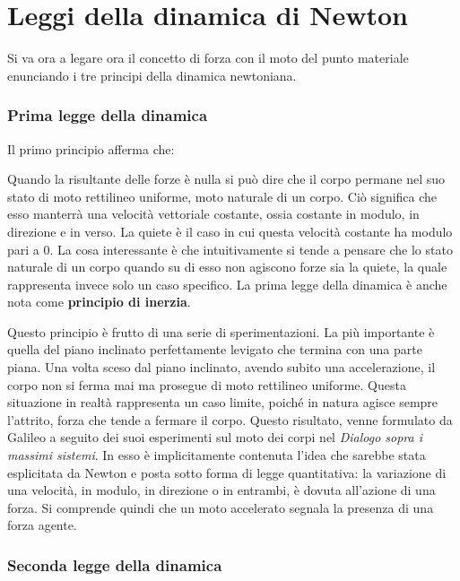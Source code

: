\documentclass[10pt,a4paper]{book}
\begin{document}
\section{Leggi della dinamica di Newton}

Si va ora a legare ora il concetto di forza con il moto del punto materiale enunciando i tre principi della dinamica newtoniana.

\subsubsection{Prima legge della dinamica}

Il primo principio afferma che:

\noindent{}

Quando la risultante delle forze è nulla si può dire che il corpo permane nel suo stato di moto rettilineo uniforme, moto naturale di un corpo. Ciò significa che esso manterrà una velocità vettoriale costante, ossia costante in modulo, in direzione e in verso. La quiete è il caso in cui questa velocità costante ha modulo pari a $0$. La cosa interessante è che intuitivamente si tende a pensare che lo stato naturale di un corpo quando su di esso non agiscono forze sia la quiete, la quale rappresenta invece solo un caso specifico. La prima legge della dinamica è anche nota come \textbf{principio di inerzia}.

Questo principio è frutto di una serie di sperimentazioni. La più importante è quella del piano inclinato perfettamente levigato che termina con una parte piana. Una volta sceso dal piano inclinato, avendo subito una accelerazione, il corpo non si ferma mai ma prosegue di moto rettilineo uniforme. Questa situazione in realtà rappresenta un caso limite, poiché in natura agisce sempre l'attrito, forza che tende a fermare il corpo. Questo risultato, venne formulato da Galileo a seguito dei suoi esperimenti sul moto dei corpi nel \textit{Dialogo sopra i massimi sistemi}. In esso è implicitamente contenuta l'idea che sarebbe stata esplicitata da Newton e posta sotto forma di legge quantitativa: la variazione di una velocità, in modulo, in direzione o in entrambi, è dovuta all'azione di una forza. Si comprende quindi che un moto accelerato segnala la presenza di una forza agente.

\subsubsection{Seconda legge della dinamica}
\end{document}
